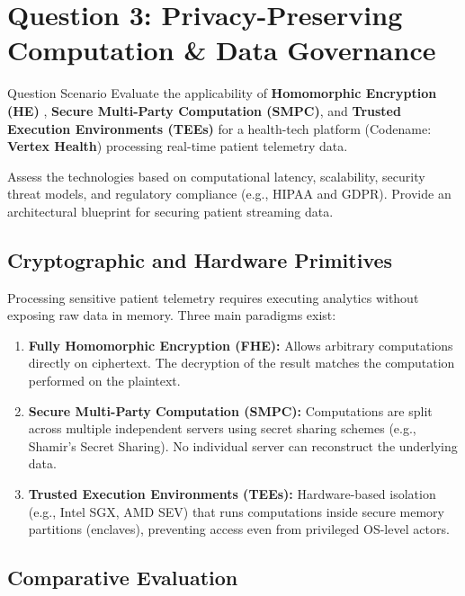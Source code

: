 \section{Question 3: Privacy-Preserving Computation \& Data Governance}
\label{sec:question3}

\begin{questionbox}{Question Scenario}
  Evaluate the applicability of \textbf{Homomorphic Encryption (HE)} \cite{chaum1982blind}, \textbf{Secure Multi-Party Computation (SMPC)}, and \textbf{Trusted Execution Environments (TEEs)} for a health-tech platform (Codename: \textbf{Vertex Health}) processing real-time patient telemetry data. 
  
  Assess the technologies based on computational latency, scalability, security threat models, and regulatory compliance (e.g., HIPAA and GDPR). Provide an architectural blueprint for securing patient streaming data.
\end{questionbox}

\subsection{Cryptographic and Hardware Primitives}

Processing sensitive patient telemetry requires executing analytics without exposing raw data in memory. Three main paradigms exist:

\begin{enumerate}
  \item \textbf{Fully Homomorphic Encryption (FHE):} Allows arbitrary computations directly on ciphertext. The decryption of the result matches the computation performed on the plaintext.
  \item \textbf{Secure Multi-Party Computation (SMPC):} Computations are split across multiple independent servers using secret sharing schemes (e.g., Shamir's Secret Sharing). No individual server can reconstruct the underlying data.
  \item \textbf{Trusted Execution Environments (TEEs):} Hardware-based isolation (e.g., Intel SGX, AMD SEV) that runs computations inside secure memory partitions (enclaves), preventing access even from privileged OS-level actors.
\end{enumerate}

\subsection{Comparative Evaluation}

